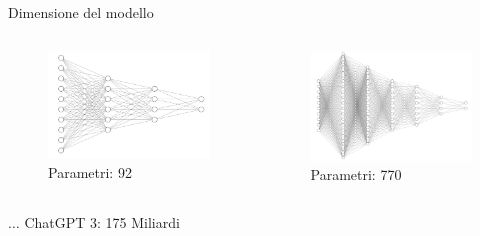 \documentclass{beamer}
\begin{document}
\begin{frame}{Dimensione del modello}
  \begin{columns}
    \begin{column}{0.48\textwidth}
        \begin{figure}
            \centering
            \includegraphics[width=1.0\linewidth]{imgs/emergent/nn1.png}
            \caption*{Parametri: 92}
        \end{figure}
    \end{column}
    
    \begin{column}{0.48\textwidth}
        \begin{figure}
            \centering
            \includegraphics[width=1.0\linewidth]{imgs/emergent/nn2.png}
            \caption*{Parametri: 770}
        \end{figure}
    \end{column}
  \end{columns}
  \pause
  \begin{center}
    $\ldots$ ChatGPT 3: 175 Miliardi
  \end{center}
\end{frame}
\end{document}
